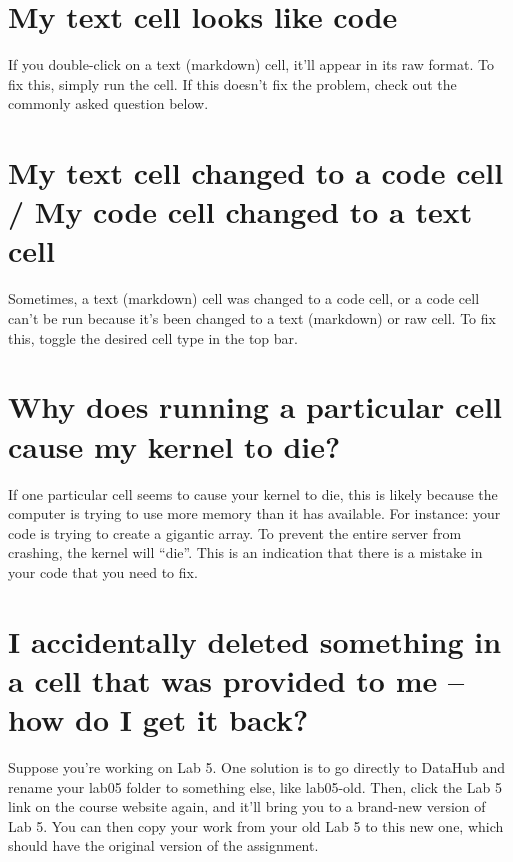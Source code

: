 \documentclass[
  letterpaper,
  DIV=11,
  numbers=noendperiod]{scrreprt}
\begin{document}
\section{My text cell looks like
code}\label{my-text-cell-looks-like-code}

If you double-click on a text (markdown) cell, it'll appear in its raw
format. To fix this, simply run the cell. If this doesn't fix the
problem, check out the commonly asked question below.

\section{My text cell changed to a code cell / My code cell changed to a
text
cell}\label{my-text-cell-changed-to-a-code-cell-my-code-cell-changed-to-a-text-cell}

Sometimes, a text (markdown) cell was changed to a code cell, or a code
cell can't be run because it's been changed to a text (markdown) or raw
cell. To fix this, toggle the desired cell type in the top bar.

\section{Why does running a particular cell cause my kernel to
die?}\label{why-does-running-a-particular-cell-cause-my-kernel-to-die}

If one particular cell seems to cause your kernel to die, this is likely
because the computer is trying to use more memory than it has available.
For instance: your code is trying to create a gigantic array. To prevent
the entire server from crashing, the kernel will ``die''. This is an
indication that there is a mistake in your code that you need to fix.

\section{I accidentally deleted something in a cell that was provided to
me -- how do I get it
back?}\label{i-accidentally-deleted-something-in-a-cell-that-was-provided-to-me-how-do-i-get-it-back}

Suppose you're working on Lab 5. One solution is to go directly to
DataHub and rename your lab05 folder to something else, like lab05-old.
Then, click the Lab 5 link on the course website again, and it'll bring
you to a brand-new version of Lab 5. You can then copy your work from
your old Lab 5 to this new one, which should have the original version
of the assignment.
\end{document}
